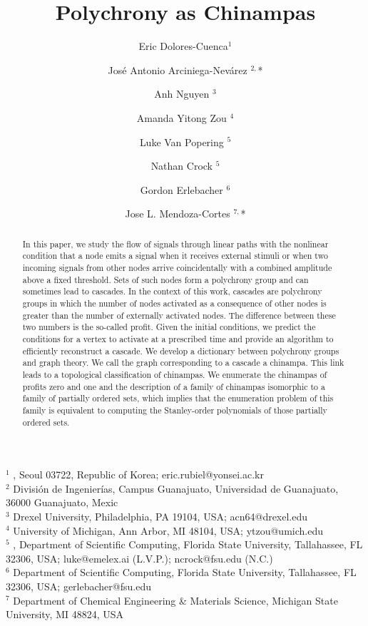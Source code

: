 \documentclass[a4paper]{article}\usepackage[english]{babel}
\title{Polychrony as Chinampas}
\author{{Eric Dolores-Cuenca}$^{1}$\and José Antonio Arciniega-Nevárez $^{2,}$*\and Anh Nguyen $^{3}$\and Amanda Yitong Zou $^{4}$\and Luke Van Popering $^{5}$\and Nathan Crock $^{5}$\and Gordon Erlebacher $^{6}$\and Jose L. Mendoza-Cortes $^{7,}$*}
\theoremstyle{definition}
\begin{document}
\maketitle

\begin{flushleft}
{%
$^{1}$ , 
Seoul {03722}, 
Republic of Korea; eric.rubiel@yonsei.ac.kr\\
$^{2}$ \quad División de Ingenierías, Campus Guanajuato, Universidad de Guanajuato, {36000 Guanajuato, Mexic}\\
$^{3}$ \quad Drexel University,  Philadelphia, PA {19104}, USA; acn64@drexel.edu\\ 
$^{4}$ \quad University of Michigan, Ann Arbor, MI {48104}, USA; ytzou@umich.edu\\
$^{5}$ , %
Department of Scientific Computing, Florida State University, Tallahassee, FL {32306}, USA; luke@emelex.ai (L.V.P.); ncrock@fsu.edu (N.C.)\\
$^{6}$ \quad Department of Scientific Computing, Florida State University, Tallahassee, FL {32306}, USA; gerlebacher@fsu.edu\\
$^{7}$ \quad Department of Chemical Engineering \& Materials Science, Michigan State University, MI {48824}, USA}
\end{flushleft}

\begin{abstract}{In this paper, we study the flow of signals through linear paths with the  nonlinear condition that a node emits a signal when it receives external stimuli or when two incoming signals from other nodes arrive coincidentally with a combined amplitude above a fixed threshold.  Sets of such nodes form a polychrony group and can sometimes lead to cascades. In the context of this work, cascades are polychrony groups in which the number of nodes activated as a consequence of other nodes is greater than the number of externally activated nodes. The difference between these two numbers is the so-called profit.  
 Given the initial conditions, we predict the conditions for a vertex to activate at a prescribed time and provide an algorithm to efficiently reconstruct a cascade. 
We develop a dictionary between polychrony groups and graph theory. We call the graph corresponding to a cascade a chinampa. This link leads to a topological classification of chinampas. We enumerate the chinampas of profits zero and one and the description of a family of chinampas isomorphic to a family of partially ordered sets, which implies that the enumeration problem of this family is equivalent to computing the Stanley-order polynomials of those partially ordered sets.}
\end{abstract}
\end{document}

